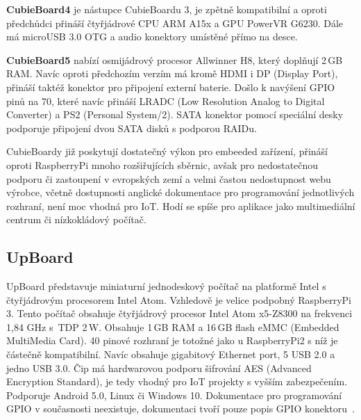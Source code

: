 		\textbf{CubieBoard4} je nástupce CubieBoardu 3, je zpětně kompatibilní a oproti předchůdci přináší čtyřjádrové CPU ARM A15x a GPU PowerVR G6230. Dále má microUSB 3.0 OTG a audio konektory umístěné přímo na desce.
		
			\textbf{CubieBoard5 }nabízí osmijádrový procesor Allwinner H8, který doplňují 2\,GB RAM. Navíc oproti předchozím verzím má kromě HDMI i DP (Display Port), přináší taktéž konektor pro připojení externí baterie. Došlo k navýšení GPIO pinů na 70, které navíc přináší LRADC (Low Resolution Analog to Digital Converter) a PS2 (Personal System/2). SATA konektor pomocí speciální desky podporuje připojení dvou SATA disků s podporou RAIDu.
		
CubieBoardy již poskytují dostatečný výkon pro embeeded zařízení, přináší oproti RaspberryPi mnoho rozšiřujících sběrnic, avšak pro nedostatečnou podporu či zastoupení v evropských zemí a velmi častou nedostupnost webu výrobce, včetně dostupnosti anglické dokumentace pro  programování jednotlivých rozhraní, není moc vhodná pro IoT. Hodí se spíše pro aplikace jako multimediální centrum či nízkokládový počítač. 	


\subsection{UpBoard}
		UpBoard představuje miniaturní jednodeskový počítač na platformě Intel s čtyřjádrovým procesorem Intel Atom. Vzhledově je velice podpobný RaspberryPi 3. 
		Tento počítač obsahuje čtyřjádrový procesor Intel Atom x5-Z8300 na frekvenci 1,84 GHz s~TDP 2\,W. Obsahuje 1\,GB RAM a 16\,GB flash eMMC (Embedded MultiMedia Card). 40 pinové rozhraní je totožné jako u RaspberryPi2 s níž je částečně kompatibilní. Navíc obsahuje gigabitový Ethernet port, 5 USB 2.0 a jedno USB 3.0. Čip má hardwarovou podporu šifrování AES (Advanced Encryption Standard), je tedy vhodný pro IoT projekty s vyšším zabezpečením. Podporuje Android 5.0, Linux či Windows 10. Dokumentace pro programování GPIO v současnosti neexistuje, dokumentaci tvoří pouze popis GPIO konektoru~\cite{UpBoard}.

